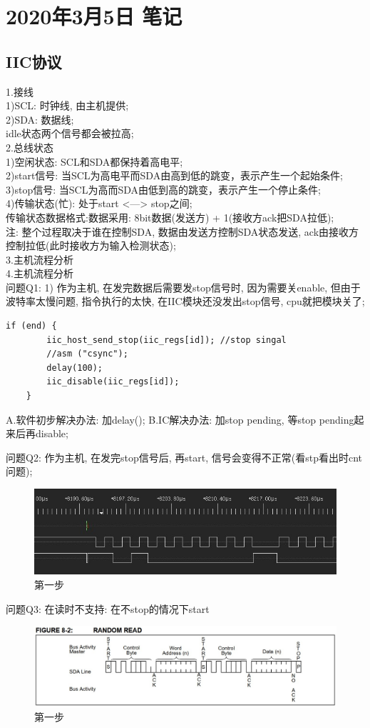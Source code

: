 \chapter{2020年3月5日 笔记}
\graphicspath{{note_everyday/004_20200305/picture/}}
\section{IIC协议}

1.接线 \\
    1)SCL: 时钟线, 由主机提供;\\
    2)SDA: 数据线;\\
    idle状态两个信号都会被拉高;\\

2.总线状态\\
    1)空闲状态: SCL和SDA都保持着高电平;\\
    2)start信号: 当SCL为高电平而SDA由高到低的跳变，表示产生一个起始条件;\\
    3)stop信号: 当SCL为高而SDA由低到高的跳变，表示产生一个停止条件;\\
    4)传输状态(忙): 处于start <---> stop之间;\\
        传输状态数据格式:数据采用: 8bit数据(发送方) + 1(接收方ack把SDA拉低);\\
        注: 整个过程取决于谁在控制SDA, 数据由发送方控制SDA状态发送, ack由接收方控制拉低(此时接收方为输入检测状态); \\

3.主机流程分析\\

4.主机流程分析\\


问题Q1:
1) 作为主机, 在发完数据后需要发stop信号时, 因为需要关enable, 但由于波特率太慢问题, 指令执行的太快, 在IIC模块还没发出stop信号, cpu就把模块关了;
\begin{lstlisting}[]
    if (end) {
    	iic_host_send_stop(iic_regs[id]); //stop singal
		//asm ("csync");
		delay(100);
		iic_disable(iic_regs[id]);
    }
\end{lstlisting}
    A.软件初步解决办法: 加delay();
    B.IC解决办法: 加stop pending, 等stop pending起来后再disable;

问题Q2: 作为主机, 在发完stop信号后, 再start, 信号会变得不正常(看stp看出时cnt问题);

\begin{figure}[h]
    \includegraphics{q2_singal.jpg}
    \caption{第一步}
\end{figure}

问题Q3: 在读时不支持: 在不stop的情况下start
\begin{figure}[h]
    \includegraphics{eeprom_random_read.jpg}
    \caption{第一步}
\end{figure}



